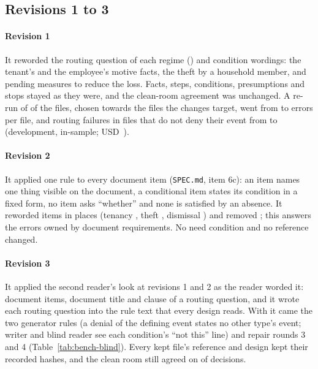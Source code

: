 \subsection{Revisions 1 to 3}
\label{supp:bench-revisions}

\paragraph{Revision 1}
It reworded the routing question of each regime (\sfourdevAllRevOneRouting) and \sfourdevAllRevOneConditions{} condition wordings: the tenant's and the employee's motive facts, the theft by a household member, and pending measures to reduce the loss. Facts, steps, conditions, presumptions and stops stayed as they were, and the clean-room agreement was unchanged. A re-run of \sfourdevRevOneFiles{} of the \sfourdevFirstAllFiles{} files, chosen towards the files the changes target, went from \sfourdevRevOneErrorsBefore{} to \sfourdevRevOneErrorsAfter{} errors per file, and routing failures in files that do not deny their event from \sfourdevRevOneRoutingOtherBefore{} to \sfourdevRevOneRoutingOtherAfter{} (development, in-sample; USD~\sfourdevRevOneSpend).

\paragraph{Revision 2}
It applied one rule to every document item (\texttt{SPEC.md}, item 6c): an item names one thing visible on the document, a conditional item states its condition in a fixed form, no item asks ``whether'' and none is satisfied by an absence. It reworded \sfourdevAllRevTwoItems{} items in \sfourdevAllRevTwoPlaces{} places (tenancy \sfourdevTenRevTwoItems, theft \sfourdevThRevTwoItems, dismissal \sfourdevDisRevTwoItems) and removed \sfourdevAllRevTwoRemoved; this answers the \sfourdevDiagAllMustShow{} errors owned by document requirements. No need condition and no reference changed.

\paragraph{Revision 3}
It applied the second reader's look at revisions 1 and 2 as the reader worded it: \sfourdevAllRevThreeItems{} document items, \sfourdevAllRevThreeTitles{} document title and \sfourdevAllRevThreeRouting{} clause of a routing question, and it wrote each routing question into the rule text that every design reads. With it came the two generator rules (a denial of the defining event states no other type's event; writer and blind reader see each condition's ``not this'' line) and repair rounds 3 and 4 (Table~\ref{tab:bench-blind}). Every kept file's reference and design kept their recorded hashes, and the clean room still agreed on \sfourdevCleanroomSame{} of \sfourdevCleanroomDocuments{} decisions.


